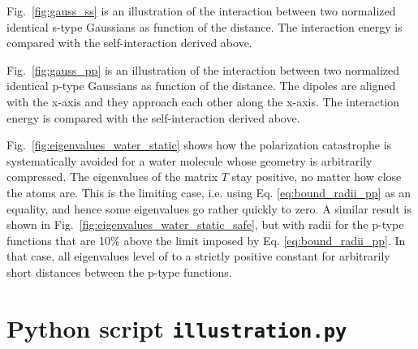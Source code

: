 \documentclass[a4paper,12pt,parskip=half]{scrartcl}
\begin{document}
Fig.\ \ref{fig:gauss_ss} is an illustration of the interaction between two normalized identical s-type Gaussians as function of the distance. The interaction energy is compared with the self-interaction derived above.

Fig.\ \ref{fig:gauss_pp} is an illustration of the interaction between two normalized identical p-type Gaussians as function of the distance. The dipoles are aligned with the x-axis and they approach each other along the x-axis. The interaction energy is compared with the self-interaction derived above.

Fig.\ \ref{fig:eigenvalues_water_static} shows how the polarization catastrophe is systematically avoided for a water molecule whose geometry is arbitrarily compressed. The eigenvalues of the matrix $T$ stay positive, no matter how close the atoms are. This is the limiting case, i.e. using Eq. \eqref{eq:bound_radii_pp} as an equality, and hence some eigenvalues go rather quickly to zero. A similar result is shown in Fig.\ \ref{fig:eigenvalues_water_static_safe}, but with radii for the p-type functions that are 10\% above the limit imposed by Eq. \eqref{eq:bound_radii_pp}. In that case, all eigenvalues level of to a strictly positive constant for arbitrarily short distances between the p-type functions.



\section{Python script \texttt{illustration.py}}


\end{document}

